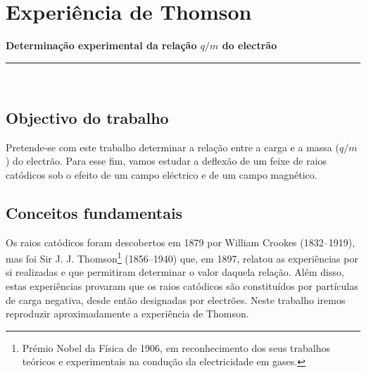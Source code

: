 \documentclass[a4paper,twoside,11pt]{report}      %
\newcommand{\HRule}{\rule{\linewidth}{0.5mm}}
\begin{document}
\chapter{ \huge{Experiência de Thomson}}
\large {\bf {Determinação experimental da relação $q/m$ do electrão}}\\
\HRule \\%

\section{\sf Objectivo do trabalho}
Pretende-se com este trabalho determinar a relação entre a carga e a massa ($q/m$) do electrão. Para esse fim, vamos estudar a deflexão de um feixe de raios catódicos sob o efeito de um campo eléctrico e de um campo magnético.

\section{\sf Conceitos fundamentais}
Os raios catódicos foram descobertos em 1879 por William Crookes (1832--1919), mas foi Sir J. J. Thomson\footnote{Prémio Nobel da Física de 1906, em reconhecimento dos seus trabalhos teóricos e experimentais na condução da electricidade em gases.} (1856--1940) que, em 1897, relatou as experiências por si realizadas e que permitiram determinar o valor daquela relação. Além disso, estas experiências provaram que os raios catódicos são constituídos por partículas de carga negativa, desde então designadas por electrões. Neste trabalho iremos reproduzir aproximadamente a experiência de Thomson.

\end{document}
